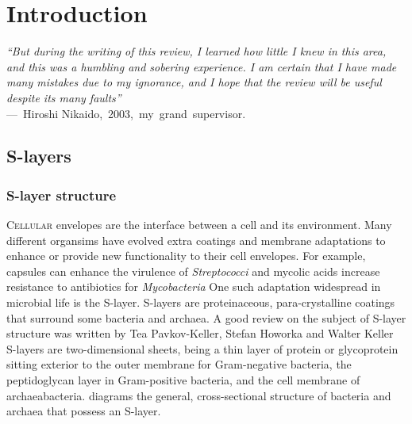 % 
\acresetall{} \resetlinenumber[1] 
  \chapter{Introduction} 
\label{ch:Introduction}

\begin{epigraph} \emph{``But during the writing of this review, I learned how little I knew in this area, and this was a humbling and sobering experience. I am certain that I have
made many mistakes due to my ignorance, and I hope that the review will be useful despite its many faults''}\\ ---~Hiroshi Nikaido,~2003,~my~grand~supervisor.
\end{epigraph}
\section{S-layers} \label{sec:intro-slayers}
\subsection{S-layer structure} %
\label{sub:s_layer_structure} \lettrine[lines=2]{C}{ellular} envelopes are the interface between a cell and its environment. Many different organsims have evolved extra coatings
and membrane adaptations to enhance or provide new functionality to their cell envelopes. For example, capsules can enhance the virulence of
\textit{Streptococci} and mycolic acids increase resistance to antibiotics for \textit{Mycobacteria} One such
adaptation widespread in microbial life is the \ac{S-layer}. \Acp{S-layer} are proteinaceous, para-crystalline coatings that surround some bacteria and
archaea. A good review on the subject of \ac{S-layer} structure was written by Tea Pavkov-Keller, Stefan Howorka and Walter
Keller \Acp{S-layer} are two-dimensional sheets, being a thin layer of protein or glycoprotein sitting exterior to the outer membrane for Gram-negative bacteria, the
peptidoglycan layer in Gram-positive bacteria, and the cell membrane of archaeabacteria.  diagrams the general, cross-sectional structure of bacteria and
archaea that possess an S-layer.

